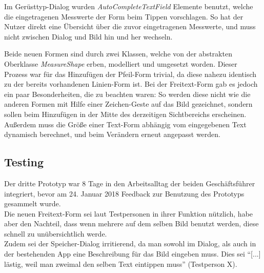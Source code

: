 Im Gerüsttyp-Dialog wurden \emph{AutoCompleteTextField} Elemente benutzt, welche die eingetragenen Messwerte der Form beim Tippen vorschlagen.
So hat der Nutzer direkt eine Übersicht über die zuvor eingetragenen Messwerte, und muss nicht zwischen Dialog und Bild hin und her wechseln. \\

Beide neuen Formen sind durch zwei Klassen, welche von der abstrakten Oberklasse \emph{MeasureShape} erben, modelliert und umgesetzt worden.
Dieser Prozess war für das Hinzufügen der Pfeil-Form trivial, da diese nahezu identisch zu der bereits vorhandenen Linien-Form ist.
Bei der Freitext-Form gab es jedoch ein paar Besonderheiten, die zu beachten waren:
So werden diese nicht wie die anderen Formen mit Hilfe einer Zeichen-Geste auf das Bild gezeichnet, sondern sollen beim Hinzufügen in der Mitte des derzeitigen Sichtbereichs erscheinen.
Außerdem muss die Größe einer Text-Form abhängig vom eingegebenen Text dynamisch berechnet, und beim Verändern erneut angepasst werden. \\

\subsection{Testing}
Der dritte Prototyp war 8 Tage in den Arbeitsalltag der beiden Geschäftsführer integriert, bevor am 24. Januar 2018 Feedback zur Benutzung des Prototyps gesammelt wurde. \\

Die neuen Freitext-Form sei laut Testpersonen in ihrer Funktion nützlich, habe aber den Nachteil, dass wenn mehrere auf dem selben Bild benutzt werden, diese schnell zu unübersichtlich werde. \\

Zudem sei der Speicher-Dialog irritierend, da man sowohl im Dialog, als auch in der bestehenden App eine Beschreibung für das Bild eingeben muss.
Dies sei ``[...] lästig, weil man zweimal den selben Text eintippen muss'' (Testperson X).

